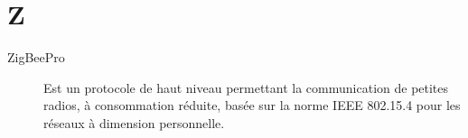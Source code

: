 \section{Z}

\begin{description}

\item[ZigBeePro]
 Est un protocole de haut niveau permettant la communication de petites radios, 
 à consommation réduite, basée sur la norme IEEE 802.15.4 pour les réseaux à 
 dimension personnelle.

\end{description}